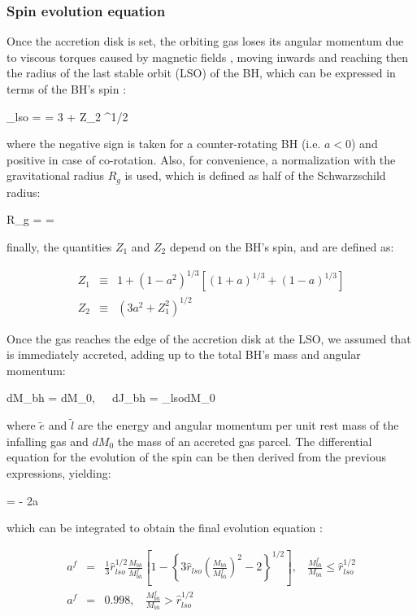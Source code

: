 \documentclass[a4,useAMS,usenatbib,usegraphicx,12pt]{article}
\begin{document}
\subsubsection{Spin evolution equation}

Once the accretion disk is set, the orbiting gas loses its angular momentum due to viscous torques
caused by magnetic fields \citep{Lynden-Bell1969}, moving inwards and reaching then the radius of the 
last stable orbit (LSO) of the BH, which can be expressed in terms of the BH's spin \citep{Bardeen1972}:

{ _{lso} =  = 3 + Z_2 \pm [ (3-Z_1)(3+Z_1+2Z_2) ]^{1/2} }

where the negative sign is taken for a counter-rotating BH (i.e. $a<0$) and positive in case of 
co-rotation. Also, for convenience, a normalization with the gravitational radius $R_g$ is used, which 
is defined as half of the Schwarzschild radius:

{ R_g =  =  }

finally, the quantities $Z_1$ and $Z_2$ depend on the BH's spin, and are defined as:

\begin{eqnarray}
Z_1 &\equiv& 1 + (1-a^2)^{1/3}\left[ (1+a)^{1/3} + (1-a)^{1/3} \right] \\
Z_2 &\equiv& ( 3a^2 + Z_1^2 )^{1/2}
\end{eqnarray}

Once the gas reaches the edge of the accretion disk at the LSO, we assumed that is immediately accreted,
adding up to the total BH's mass and angular momentum:

{ dM_{bh} = dM_0,\ \ \ dJ_{bh} = _{lso}dM_0 }

where $\tilde{e}$ and $\tilde{l}$ are the energy and angular momentum per unit rest mass of the infalling
gas and $dM_0$ the mass of an accreted gas parcel. The differential equation for the evolution of the spin 
can be then derived from the previous expressions, yielding:

{  =  - 2a }

which can be integrated to obtain the final evolution equation \citep{Bardeen1970}:

\begin{eqnarray}
a^f  & = & \frac{1}{3}\hat{r}_{lso}^{1/2}\frac{M_{bh}}{M^f_{bh}}\left[ 1 - \left\{ 3\hat{r}_{lso}\left(\frac{M_{bh}}{M^f_{bh}}\right)^2 - 2 \right\}^{1/2} \right],
    \ \ \ \ \frac{M^f_{bh}}{M_{bh}} \leq \hat{r}_{lso}^{1/2} \\
a^f  & = & 0.998, \ \ \ \ \frac{M^f_{bh}}{M_{bh}} > \hat{r}_{lso}^{1/2}
\end{eqnarray}
\end{document}
